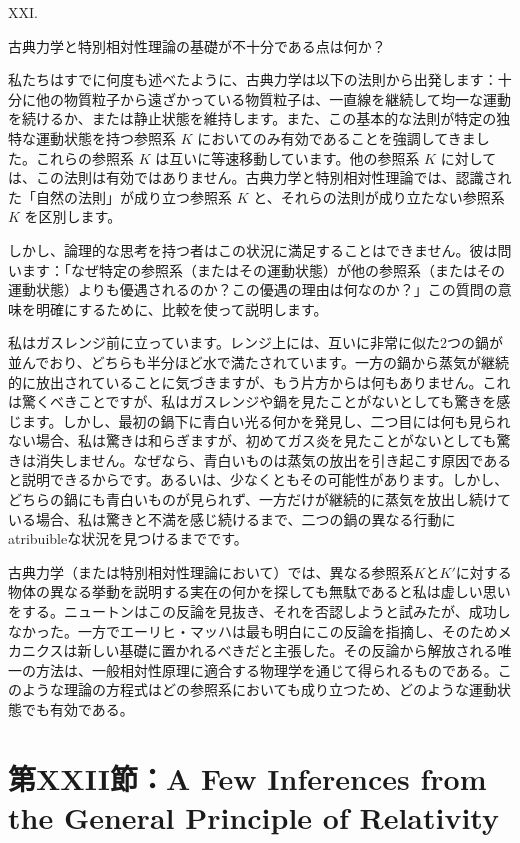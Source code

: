 \documentclass[a4paper,11pt,openany]{ltjsbook}
\begin{document}
XXI.

古典力学と特別相対性理論の基礎が不十分である点は何か？

私たちはすでに何度も述べたように、古典力学は以下の法則から出発します：十分に他の物質粒子から遠ざかっている物質粒子は、一直線を継続して均一な運動を続けるか、または静止状態を維持します。また、この基本的な法則が特定の独特な運動状態を持つ参照系 $K$ においてのみ有効であることを強調してきました。これらの参照系 $K$ は互いに等速移動しています。他の参照系 $K$ に対しては、この法則は有効ではありません。古典力学と特別相対性理論では、認識された「自然の法則」が成り立つ参照系 $K$ と、それらの法則が成り立たない参照系 $K$ を区別します。

しかし、論理的な思考を持つ者はこの状況に満足することはできません。彼は問います：「なぜ特定の参照系（またはその運動状態）が他の参照系（またはその運動状態）よりも優遇されるのか？この優遇の理由は何なのか？」この質問の意味を明確にするために、比較を使って説明します。

私はガスレンジ前に立っています。レンジ上には、互いに非常に似た2つの鍋が並んでおり、どちらも半分ほど水で満たされています。一方の鍋から蒸気が継続的に放出されていることに気づきますが、もう片方からは何もありません。これは驚くべきことですが、私はガスレンジや鍋を見たことがないとしても驚きを感じます。しかし、最初の鍋下に青白い光る何かを発見し、二つ目には何も見られない場合、私は驚きは和らぎますが、初めてガス炎を見たことがないとしても驚きは消失しません。なぜなら、青白いものは蒸気の放出を引き起こす原因であると説明できるからです。あるいは、少なくともその可能性があります。しかし、どちらの鍋にも青白いものが見られず、一方だけが継続的に蒸気を放出し続けている場合、私は驚きと不満を感じ続けるまで、二つの鍋の異なる行動に atribuibleな状況を見つけるまでです。

古典力学（または特別相対性理論において）では、異なる参照系$K$と$K′$に対する物体の異なる挙動を説明する実在の何かを探しても無駄であると私は虚しい思いをする。ニュートンはこの反論を見抜き、それを否認しようと試みたが、成功しなかった。一方でエーリヒ・マッハは最も明白にこの反論を指摘し、そのためメカニクスは新しい基礎に置かれるべきだと主張した。その反論から解放される唯一の方法は、一般相対性原理に適合する物理学を通じて得られるものである。このような理論の方程式はどの参照系においても成り立つため、どのような運動状態でも有効である。


\clearpage
\chapter{第XXII節：A Few Inferences from the General Principle of Relativity}
\end{document}
